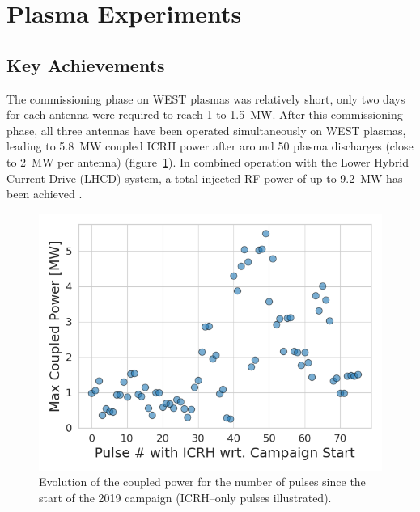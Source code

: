 \documentclass[12p]{iopart}
\begin{document}
\section{Plasma Experiments}
\subsection{Key Achievements}
The commissioning phase on WEST plasmas was relatively short, only two days for each antenna were required to reach 1 to \SI{1.5}{\mega\watt}. After this commissioning phase, all three antennas have been operated simultaneously on WEST plasmas, leading to \SI{5.8}{\mega\watt} coupled ICRH power after around 50 plasma discharges (close to \SI{2}{\mega\watt} per antenna) (figure~\ref{fig:westicrhcoupledpowervspulse}). In combined operation with the Lower Hybrid Current Drive (LHCD) system, a total injected RF power of up to \SI{9.2}{\mega\watt} has been achieved \cite{bucalossi2021}. 

\begin{figure}
	\centering
	\includegraphics[width=0.95\linewidth]{figures/WEST_ICRH_CoupledPower_vs_pulse}
	\caption{Evolution of the coupled power for the number of pulses since the start of the 2019 campaign (ICRH–only pulses illustrated). }
	\label{fig:westicrhcoupledpowervspulse}
\end{figure}
\end{document}
